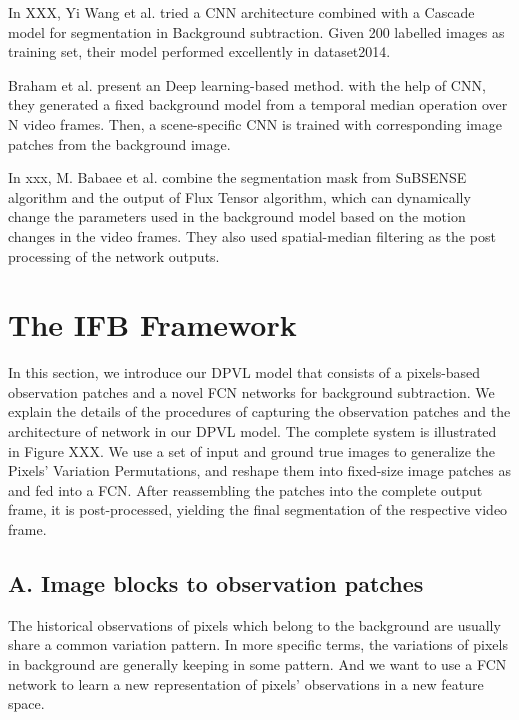 \documentclass[journal]{IEEEtran}
\begin{document}
In XXX, Yi Wang et al.
tried a CNN architecture combined with a Cascade model for segmentation in Background subtraction.
Given 200 labelled images as training set, their model performed excellently in dataset2014.

Braham et al.
present an Deep learning-based method.
with the help of CNN, they generated a fixed background model from a temporal median operation over N video frames.
Then, a scene-specific CNN is trained with corresponding image patches from the background image.

In xxx, M.
Babaee et al.
combine the segmentation mask from SuBSENSE algorithm and the output of Flux Tensor algorithm, which can dynamically change the parameters used in the background model based on the motion changes in the video frames.
They also used spatial-median filtering as the post processing of the network outputs.


\section{The IFB Framework}
\label{sec3}
In this section, we introduce our DPVL model that consists of a pixels-based observation patches and a novel FCN networks for background subtraction.
We explain the details of the procedures of capturing the observation patches and the architecture of network in our DPVL model.
The complete system is illustrated in Figure XXX.
We use a set of input and ground true images to generalize the Pixels’ Variation Permutations, and reshape them into fixed-size image patches as and fed into a FCN.
After reassembling the patches into the complete output frame, it is post-processed, yielding the final segmentation of the respective video frame.



% 
% 

\subsection{A. Image blocks to observation  patches}
\label{sec3_fc}
The historical observations of pixels which belong to the background are usually share a common variation pattern.
In more specific terms, the variations of pixels in background are generally keeping in some pattern.
And we want to use a FCN network to learn a new representation of pixels’ observations in a new feature space.
  
\end{document}
